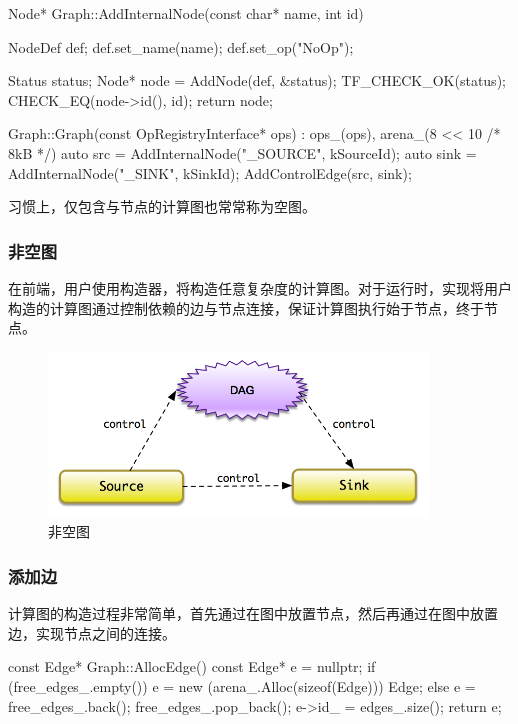 \begin{content}
\begin{leftbar}
\begin{c++}
Node* Graph::AddInternalNode(const char* name, int id) {
  NodeDef def;
  def.set_name(name);
  def.set_op("NoOp");

  Status status;
  Node* node = AddNode(def, &status);
  TF_CHECK_OK(status);
  CHECK_EQ(node->id(), id);
  return node;
}

Graph::Graph(const OpRegistryInterface* ops)
    : ops_(ops), arena_(8 << 10 /* 8kB */) {
  auto src  = AddInternalNode("_SOURCE", kSourceId);
  auto sink = AddInternalNode("_SINK",   kSinkId);
  AddControlEdge(src, sink);
}
\end{c++}
\end{leftbar}

习惯上，仅包含与节点的计算图也常常称为空图。

\subsubsection{非空图}

在前端，用户使用构造器，将构造任意复杂度的计算图。对于运行时，实现将用户构造的计算图通过控制依赖的边与节点连接，保证计算图执行始于节点，终于节点。

\begin{figure}[!htbp]
\centering
\includegraphics[width=0.9\textwidth]{figures/cc-non-empty-graph.png}
\caption{非空图}
 \label{fig:cc-non-empty-graph}
\end{figure}

\subsubsection{添加边}

计算图的构造过程非常简单，首先通过在图中放置节点，然后再通过在图中放置边，实现节点之间的连接。

\begin{leftbar}
\begin{c++}
const Edge* Graph::AllocEdge() const {
  Edge* e = nullptr;
  if (free_edges_.empty()) {
    e = new (arena_.Alloc(sizeof(Edge))) Edge;
  } else {
    e = free_edges_.back();
    free_edges_.pop_back();
  }
  e->id_ = edges_.size();
  return e;
}


\end{c++}
\end{leftbar}
\end{content}

